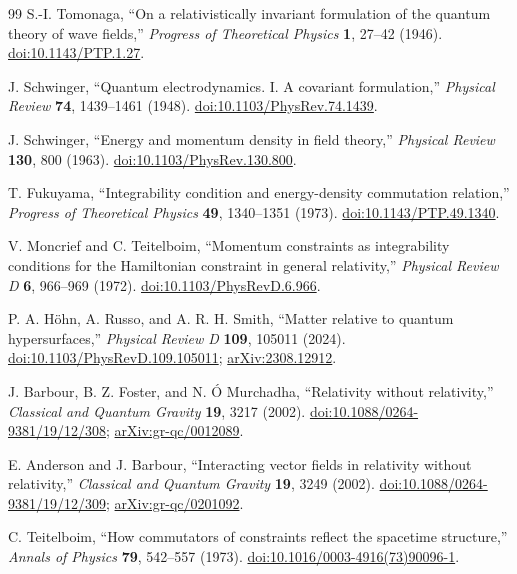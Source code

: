 \documentclass[11pt]{article}
\begin{document}
\begin{thebibliography}{99}
S.-I. Tomonaga,
``On a relativistically invariant formulation of the quantum theory of wave fields,''
\emph{Progress of Theoretical Physics} \textbf{1}, 27--42 (1946).
\href{https://doi.org/10.1143/PTP.1.27}{doi:10.1143/PTP.1.27}.

J. Schwinger,
``Quantum electrodynamics. I. A covariant formulation,''
\emph{Physical Review} \textbf{74}, 1439--1461 (1948).
\href{https://doi.org/10.1103/PhysRev.74.1439}{doi:10.1103/PhysRev.74.1439}.

J. Schwinger,
``Energy and momentum density in field theory,''
\emph{Physical Review} \textbf{130}, 800 (1963).
\href{https://doi.org/10.1103/PhysRev.130.800}{doi:10.1103/PhysRev.130.800}.

T. Fukuyama,
``Integrability condition and energy-density commutation relation,''
\emph{Progress of Theoretical Physics} \textbf{49}, 1340--1351 (1973).
\href{https://doi.org/10.1143/PTP.49.1340}{doi:10.1143/PTP.49.1340}.

V. Moncrief and C. Teitelboim,
``Momentum constraints as integrability conditions for the Hamiltonian constraint in general relativity,''
\emph{Physical Review D} \textbf{6}, 966--969 (1972).
\href{https://doi.org/10.1103/PhysRevD.6.966}{doi:10.1103/PhysRevD.6.966}.

P. A. H\"ohn, A. Russo, and A. R. H. Smith,
``Matter relative to quantum hypersurfaces,''
\emph{Physical Review D} \textbf{109}, 105011 (2024).
\href{https://doi.org/10.1103/PhysRevD.109.105011}{doi:10.1103/PhysRevD.109.105011};
\href{https://arxiv.org/abs/2308.12912}{arXiv:2308.12912}.

J. Barbour, B. Z. Foster, and N. {\'O} Murchadha,
``Relativity without relativity,''
\emph{Classical and Quantum Gravity} \textbf{19}, 3217 (2002).
\href{https://doi.org/10.1088/0264-9381/19/12/308}{doi:10.1088/0264-9381/19/12/308};
\href{https://arxiv.org/abs/gr-qc/0012089}{arXiv:gr-qc/0012089}.

E. Anderson and J. Barbour,
``Interacting vector fields in relativity without relativity,''
\emph{Classical and Quantum Gravity} \textbf{19}, 3249 (2002).
\href{https://doi.org/10.1088/0264-9381/19/12/309}{doi:10.1088/0264-9381/19/12/309};
\href{https://arxiv.org/abs/gr-qc/0201092}{arXiv:gr-qc/0201092}.

C. Teitelboim,
``How commutators of constraints reflect the spacetime structure,''
\emph{Annals of Physics} \textbf{79}, 542--557 (1973).
\href{https://doi.org/10.1016/0003-4916(73)90096-1}{doi:10.1016/0003-4916(73)90096-1}.


\end{thebibliography}
\end{document}
